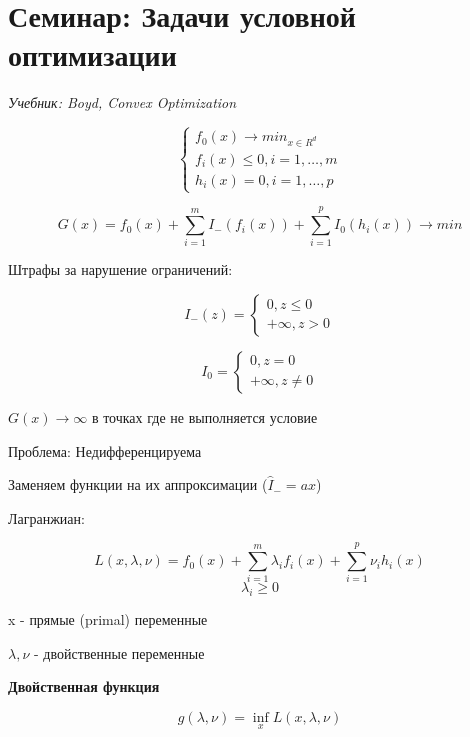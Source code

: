 \documentclass[a4paper, 12pt]{article}
\begin{document}
\section{Семинар: Задачи условной оптимизации}

\textit{Учебник: Boyd, Convex Optimization}

\[\begin{cases}
    f_0(x) \rightarrow min_{x \in R^d} \\
    f_i(x) \leq 0, i = 1, \ldots, m \\
    h_i(x) = 0, i = 1, \ldots, p
\end{cases}\]

\[G(x) = f_0(x) + \sum_{i = 1}^m I_{-}(f_i(x)) + \sum_{i = 1}^p I_0(h_i(x)) \rightarrow min\]

Штрафы за нарушение ограничений:

\[I_{-}(z) = \begin{cases}
    0, z \leq 0 \\
    + \infty, z > 0 
\end{cases}\]

\[I_{0} = \begin{cases}
    0, z = 0 \\
    + \infty, z \neq 0 
\end{cases}\]

\(G(x) \rightarrow \infty\) в точках где не выполняется условие

Проблема: Недифференцируема

Заменяем функции на их аппроксимации ($\hat{I}_{-} = ax$)

Лагранжиан:

\[L(x, \lambda, \nu) = f_0(x) + \sum_{i = 1}^m \lambda_i f_i(x) + \sum_{i = 1}^p \nu_i h_i(x)\]
\[\lambda_i \geq 0\]

x - прямые (primal) переменные

$\lambda, \nu$ - двойственные переменные

\textbf{Двойственная функция}

\[g(\lambda, \nu) = \inf_{x} L(x, \lambda, \nu)\]
\end{document}
